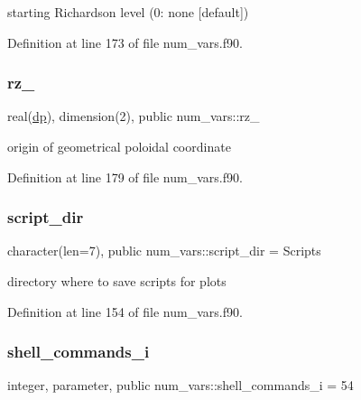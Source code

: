 starting Richardson level (0\+: none \mbox{[}default\mbox{]}) 



Definition at line 173 of file num\+\_\+vars.\+f90.

\mbox{\label{namespacenum__vars_aac566d69891d40b90df6b90d18e16039}} 
\subsubsection{\texorpdfstring{rz\+\_}{rz\_0}}
{\footnotesize\ttfamily real(\hyperlink{namespacenum__vars_a03802aa2bd86439d7a9370836fabf3f2}{dp}), dimension(2), public num\+\_\+vars\+::rz\+\_}



origin of geometrical poloidal coordinate 



Definition at line 179 of file num\+\_\+vars.\+f90.

\mbox{\label{namespacenum__vars_a2b5f419579cb2d0ac2adda364be58fb5}} 
\subsubsection{\texorpdfstring{script\+\_\+dir}{script\_dir}}
{\footnotesize\ttfamily character(len=7), public num\+\_\+vars\+::script\+\_\+dir = \textquotesingle{}Scripts\textquotesingle{}}



directory where to save scripts for plots 



Definition at line 154 of file num\+\_\+vars.\+f90.

\mbox{\label{namespacenum__vars_a2e139da75c6bcec4376b38d3ea1c5aa7}} 
\subsubsection{\texorpdfstring{shell\+\_\+commands\+\_\+i}{shell\_commands\_i}}
{\footnotesize\ttfamily integer, parameter, public num\+\_\+vars\+::shell\+\_\+commands\+\_\+i = 54}



